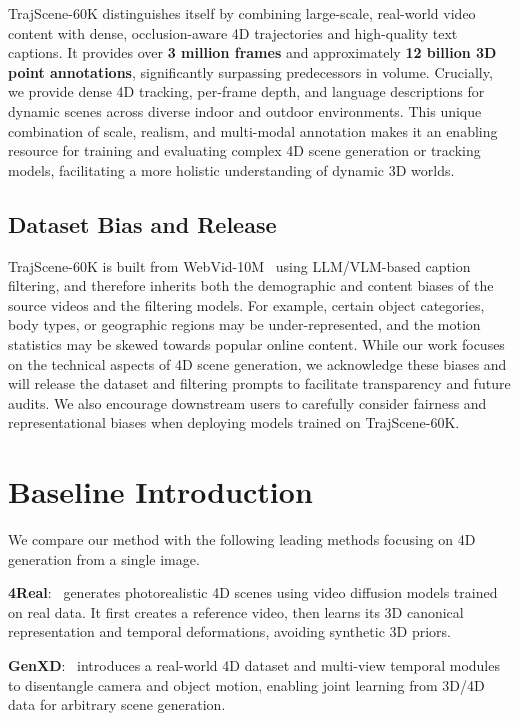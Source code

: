 TrajScene-60K distinguishes itself by combining large-scale, real-world video content with dense, occlusion-aware 4D trajectories and high-quality text captions. It provides over \textbf{3 million frames} and approximately \textbf{12 billion 3D point annotations}, significantly surpassing predecessors in volume. Crucially, we provide dense 4D tracking, per-frame depth, and language descriptions for dynamic scenes across diverse indoor and outdoor environments. This unique combination of scale, realism, and multi-modal annotation makes it an enabling resource for training and evaluating complex 4D scene generation or tracking models, facilitating a more holistic understanding of dynamic 3D worlds.


\subsection{Dataset Bias and Release}

TrajScene-60K is built from WebVid-10M~\cite{webvid} using LLM/VLM-based caption filtering, and therefore inherits both the demographic and content biases of the source videos and the filtering models. For example, certain object categories, body types, or geographic regions may be under-represented, and the motion statistics may be skewed towards popular online content. While our work focuses on the technical aspects of 4D scene generation, we acknowledge these biases and will release the dataset and filtering prompts to facilitate transparency and future audits. We also encourage downstream users to carefully consider fairness and representational biases when deploying models trained on TrajScene-60K.







\section{Baseline Introduction}
\label{sec:e}
We compare our method with the following leading methods focusing on 4D generation from a single image. 

\noindent\textbf{4Real}:~\cite{4real} generates photorealistic 4D scenes using video diffusion models trained on real data. It first creates a reference video, then learns its 3D canonical representation and temporal deformations, avoiding synthetic 3D priors.

\noindent\textbf{GenXD}:~\cite{genXD} introduces a real-world 4D dataset and multi-view temporal modules to disentangle camera and object motion, enabling joint learning from 3D/4D data for arbitrary scene generation.

